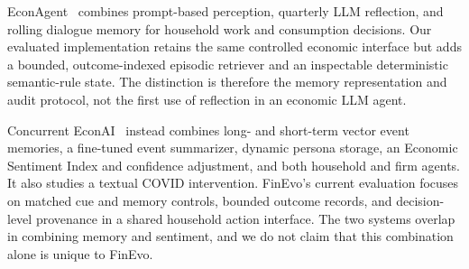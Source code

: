 \ifdefined\FinEvoAllowHistoricalPrePZeroEvidence\else
{}
\fi
EconAgent~\citep{li2024econagent} combines prompt-based perception, quarterly
LLM reflection, and rolling dialogue memory for household work and consumption
decisions.  Our evaluated implementation retains the same controlled economic
interface but adds a bounded, outcome-indexed episodic retriever and an
inspectable deterministic semantic-rule state.  The distinction is therefore
the memory representation and audit protocol, not the first use of reflection
in an economic LLM agent.

Concurrent EconAI~\citep{liu2026econai} instead combines long- and short-term
vector event memories, a fine-tuned event summarizer, dynamic persona storage,
an Economic Sentiment Index and confidence adjustment, and both household and
firm agents.  It also studies a textual COVID intervention.  FinEvo's current
evaluation focuses on matched cue and memory controls, bounded outcome records,
and decision-level provenance in a shared household action interface.  The two
systems overlap in combining memory and sentiment, and we do not claim that
this combination alone is unique to FinEvo.
